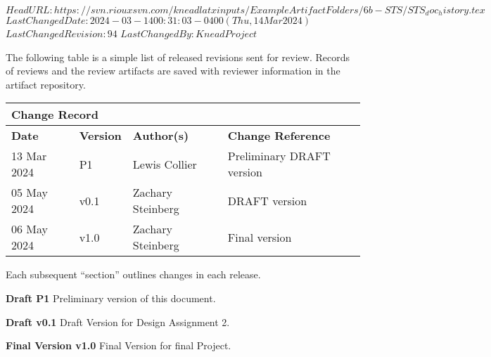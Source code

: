 \svnidlong
{$HeadURL: https://svn.riouxsvn.com/kneadlatxinputs/ExampleArtifactFolders/6b-STS/STS_doc_history.tex $}
{$LastChangedDate: 2024-03-14 00:31:03 -0400 (Thu, 14 Mar 2024) $}
{$LastChangedRevision: 94 $}
{$LastChangedBy: KneadProject $}

The following table is a simple list of released revisions sent for review.
Records of reviews and the review artifacts are saved with reviewer information in the \KNEADagencyName artifact repository.

\begin{table}[h]
	\centering 
		\begin{tabular}{|p{1.0in}|p{0.8in}|p{1.4in}|p{2.1in}|}
    \multicolumn{4}{l}{\bfseries Change Record} \\
		\hline
			{\bfseries Date}  &  {\bfseries Version} & {\bfseries Author(s)} & {\bfseries Change Reference} \\
		\hline
		\hline
			 13 Mar 2024	&	\centering	P1	&	{\raggedright Lewis Collier}	&	Preliminary DRAFT version  \\ \hline
			 05 May 2024	&	\centering	v0.1	&	{\raggedright Zachary Steinberg}	&	DRAFT version  \\ \hline
			 06 May 2024	&	\centering	v1.0	&	{\raggedright Zachary Steinberg}	&	Final version \\ \hline
		\hline		
		\hline				
  	\end{tabular}
\end{table}

Each subsequent ``section'' outlines changes in each release.

{\bf Draft P1}
Preliminary version of this document.

{\bf Draft v0.1}
Draft Version for Design Assignment 2.

{\bf Final Version v1.0}
Final Version for final Project.



